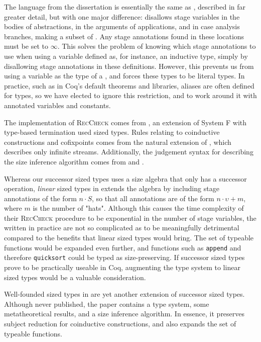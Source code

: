 \documentclass[sigplan,10pt,anonymous,review,nonacm]{acmart}
\begin{document}
The language \CIChatbar from the dissertation \cite{cic-hat-bar} is essentially the same as \CIChat, described in far greater detail, but with one major difference: \CIChatbar disallows stage variables in the bodies of abstractions, in the arguments of applications, and in case analysis branches, making \CIChatbar a subset of \CIChat. Any stage annotations found in these locations must be set to $\infty$. This solves the problem of knowing which stage annotations to use when using a variable defined as, for instance, an inductive type, simply by disallowing stage annotations in these definitions. However, this prevents us from using a variable as the \corecursive type of a \cofixpoint, and forces these types to be literal \coinductive types. In practice, such as in Coq's default theorems and libraries, aliases are often defined for \coinductive types, so we have elected to ignore this restriction, and to work around it with annotated variables and constants.

The implementation of \textsc{RecCheck} comes from \Fhat \cite{f-hat}, an extension of System F with type-based termination used sized types. Rules relating to coinductive constructions and cofixpoints comes from the natural extension of \CChatomega \cite{cc-hat-omega}, which describes only infinite streams. Additionally, the judgement syntax for describing the size inference algorithm comes from \CChatomega and \CIChatl \cite{cic-hat-l}.

Whereas our successor sized types uses a size algebra that only has a successor operation, \textit{linear} sized types in \CIChatl extends the algebra by including stage annotations of the form $n \cdot S$, so that all annotations are of the form $n \cdot \upsilon + m$, where $m$ is the number of "hats". Although this causes the time complexity of their \textsc{RecCheck} procedure to be exponential in the number of stage variables, the \cofixpoints written in practice are not so complicated as to be meaningfully detrimental compared to the benefits that linear sized types would bring. The set of typeable functions would be expanded even further, and functions such as \texttt{append} and therefore \texttt{quicksort} could be typed as size-preserving. If successor sized types prove to be practically useable in Coq, augmenting the type system to linear sized types would be a valuable consideration.

Well-founded sized types in \CIChatsub \cite{wellfounded} are yet another extension of successor sized types. Although never published, the paper contains a type system, some metatheoretical results, and a size inference algorithm. In essence, it preserves subject reduction for coinductive constructions, and also expands the set of typeable functions.
\end{document}
